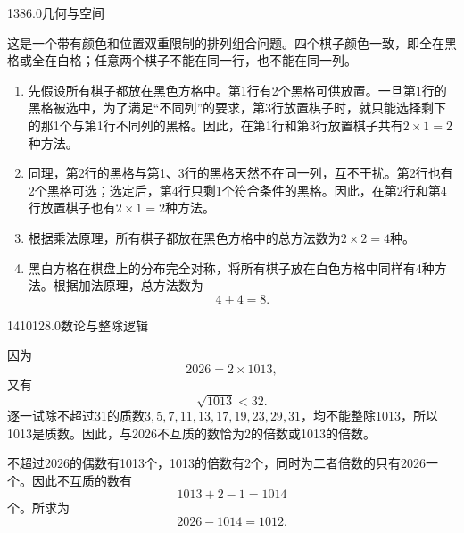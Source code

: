\begin{solution}{13}{8}{6.0}{几何与空间}

这是一个带有颜色和位置双重限制的排列组合问题。四个棋子颜色一致，即全在黑格或全在白格；任意两个棋子不能在同一行，也不能在同一列。

\begin{enumerate}[label=\textbf{Step \arabic*:},leftmargin=*]
  \item 先假设所有棋子都放在黑色方格中。第1行有2个黑格可供放置。一旦第1行的黑格被选中，为了满足“不同列”的要求，第3行放置棋子时，就只能选择剩下的那1个与第1行不同列的黑格。因此，在第1行和第3行放置棋子共有\(2\times1=2\)种方法。
  \item 同理，第2行的黑格与第1、3行的黑格天然不在同一列，互不干扰。第2行也有2个黑格可选；选定后，第4行只剩1个符合条件的黑格。因此，在第2行和第4行放置棋子也有\(2\times1=2\)种方法。
  \item 根据乘法原理，所有棋子都放在黑色方格中的总方法数为\(2\times2=4\)种。
  \item 黑白方格在棋盘上的分布完全对称，将所有棋子放在白色方格中同样有4种方法。根据加法原理，总方法数为
  \[
    4+4=8.
  \]
\end{enumerate}

\end{solution}

\begin{solution}{14}{1012}{8.0}{数论与整除逻辑}

因为
\[
  2026=2\times1013,
\]
又有
\[
  \sqrt{1013}<32.
\]
逐一试除不超过31的质数\(3,5,7,11,13,17,19,23,29,31\)，均不能整除1013，所以1013是质数。因此，与2026不互质的数恰为2的倍数或1013的倍数。

不超过2026的偶数有1013个，1013的倍数有2个，同时为二者倍数的只有2026一个。因此不互质的数有
\[
  1013+2-1=1014
\]
个。所求为
\[
  2026-1014=1012.
\]

\end{solution}

